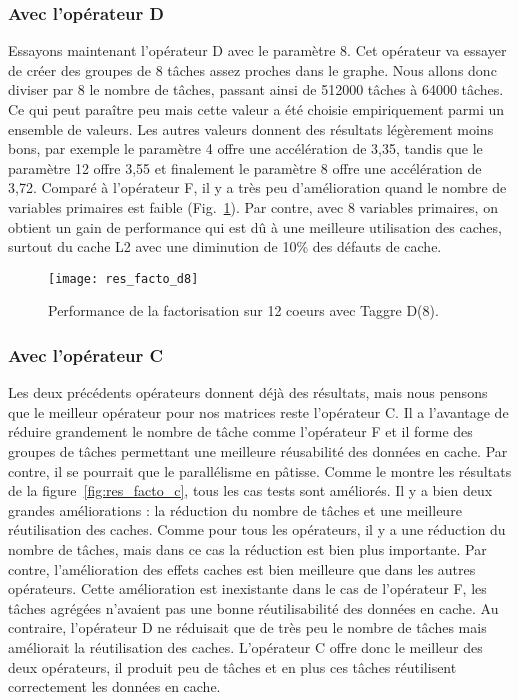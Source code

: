 \subsubsection{Avec l'opérateur D}
Essayons maintenant l'opérateur D avec le paramètre 8.
%
Cet opérateur va essayer de créer des groupes de 8 tâches assez proches dans le graphe.
%
Nous allons donc diviser par 8 le nombre de tâches, passant ainsi de 512000 tâches à 64000 tâches.
%
Ce qui peut paraître peu mais cette valeur a été choisie empiriquement parmi un ensemble de valeurs.
%
Les autres valeurs donnent des résultats légèrement moins bons, par exemple le paramètre 4 offre une accélération de 3,35, tandis que le paramètre 12 offre 3,55 et finalement le paramètre 8 offre une accélération de 3,72.
%
Comparé à l'opérateur F, il y a très peu d'amélioration quand le nombre de variables primaires est faible (Fig.~\ref{fig:res_facto_d8}).
%
Par contre, avec 8 variables primaires, on obtient un gain de performance qui est dû à une meilleure utilisation des caches, surtout du cache L2 avec une diminution de 10\% des défauts de cache.

\begin{figure}[!h]
  \centering
  \texttt{[image: res\_facto\_d8]}
  \caption{Performance de la factorisation sur 12 coeurs avec Taggre D(8).}
  \label{fig:res_facto_d8}
\end{figure}





\subsubsection{Avec l'opérateur C}
Les deux précédents opérateurs donnent déjà des résultats, mais nous pensons que le meilleur opérateur pour nos matrices reste l'opérateur C.
%
Il a l'avantage de réduire grandement le nombre de tâche comme l'opérateur F et il forme des groupes de tâches permettant une meilleure réusabilité des données en cache.
%
Par contre, il se pourrait que le parallélisme en pâtisse.
%
Comme le montre les résultats de la figure~\ref{fig:res_facto_c}, tous les cas tests sont améliorés.
%
Il y a bien deux grandes améliorations : la réduction du nombre de tâches et une meilleure réutilisation des caches.
%
Comme pour tous les opérateurs, il y a une réduction du nombre de tâches, mais dans ce cas la réduction est bien plus importante.
%
Par contre, l'amélioration des effets caches est bien meilleure que dans les autres opérateurs.
%
Cette amélioration est inexistante dans le cas de l'opérateur F, les tâches agrégées n'avaient pas une bonne réutilisabilité des données en cache.
%
Au contraire, l'opérateur D ne réduisait que de très peu le nombre de tâches mais améliorait la réutilisation des caches.
%
L'opérateur C offre donc le meilleur des deux opérateurs, il produit peu de tâches et en plus ces tâches réutilisent correctement les données en cache.


